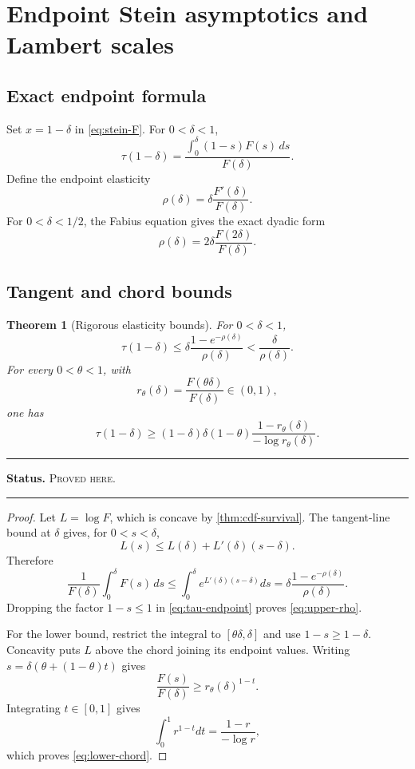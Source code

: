 \documentclass[11pt,oneside]{article}
\newtheorem{theorem}{Theorem}[section]
\theoremstyle{definition}
\theoremstyle{remark}
\newenvironment{boxedremark}{%
  \par\smallskip\noindent\begin{center}\begin{minipage}{0.94\textwidth}%
  \color{black}\hrule\vspace{0.6em}\small
}{%
  \vspace{0.6em}\hrule\end{minipage}\end{center}\smallskip
}
\newcommand{\ProvedHere}{\textsc{Proved here}}
\newcommand{\Status}[1]{%
  \begin{boxedremark}\textbf{Status.} #1.\end{boxedremark}}
\begin{document}
\section{Endpoint Stein asymptotics and Lambert scales}

\subsection{Exact endpoint formula}
Set $x=1-\delta$ in \eqref{eq:stein-F}.  For $0<\delta<1$,
\begin{equation}\label{eq:tau-endpoint}
 \tau(1-\delta)
 =\frac{\displaystyle\int_0^\delta(1-s)F(s)\,ds}{F(\delta)}.
\end{equation}
Define the endpoint elasticity
\begin{equation}\label{eq:rho}
 \rho(\delta)=\delta\frac{F'(\delta)}{F(\delta)}.
\end{equation}
For $0<\delta<1/2$, the Fabius equation gives the exact dyadic form
\begin{equation}\label{eq:rho-dyadic}
 \rho(\delta)=2\delta\frac{F(2\delta)}{F(\delta)}.
\end{equation}

\subsection{Tangent and chord bounds}
\begin{theorem}[Rigorous elasticity bounds]\label{thm:endpoint-bounds}
For $0<\delta<1$,
\begin{equation}\label{eq:upper-rho}
 \tau(1-\delta)
 \le \delta\frac{1-e^{-\rho(\delta)}}{\rho(\delta)}
 <\frac{\delta}{\rho(\delta)}.
\end{equation}
For every $0<\theta<1$, with
\[
 r_\theta(\delta)=\frac{F(\theta\delta)}{F(\delta)}\in(0,1),
\]
one has
\begin{equation}\label{eq:lower-chord}
 \tau(1-\delta)
 \ge (1-\delta)\delta(1-\theta)
 \frac{1-r_\theta(\delta)}{-\log r_\theta(\delta)}.
\end{equation}
\end{theorem}
\Status{\ProvedHere}

\begin{proof}
Let $L=\log F$, which is concave by \cref{thm:cdf-survival}.  The tangent-line
bound at $\delta$ gives, for $0<s<\delta$,
\[
 L(s)\le L(\delta)+L'(\delta)(s-\delta).
\]
Therefore
\[
 \frac1{F(\delta)}\int_0^\delta F(s)\,ds
 \le\int_0^\delta e^{L'(\delta)(s-\delta)}ds
 =\delta\frac{1-e^{-\rho(\delta)}}{\rho(\delta)}.
\]
Dropping the factor $1-s\le1$ in \eqref{eq:tau-endpoint} proves
\eqref{eq:upper-rho}.

For the lower bound, restrict the integral to $[\theta\delta,\delta]$ and use
$1-s\ge1-\delta$.  Concavity puts $L$ above the chord joining its endpoint values.
Writing $s=\delta(\theta+(1-\theta)t)$ gives
\[
 \frac{F(s)}{F(\delta)}\ge r_\theta(\delta)^{1-t}.
\]
Integrating $t\in[0,1]$ gives
\[
 \int_0^1r^{1-t}dt=\frac{1-r}{-\log r},
\]
which proves \eqref{eq:lower-chord}.
\end{proof}
\end{document}
